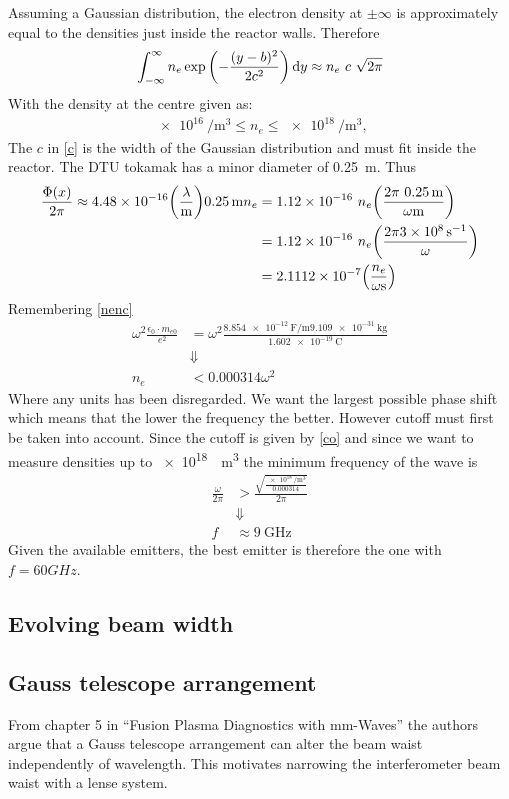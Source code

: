 Assuming a Gaussian distribution, the electron density at \(\pm\infty\) is approximately equal to the densities just inside the reactor walls. Therefore
\begin{align}
  \int_{-\infty}^{\infty}n_e \exp\pqty{-\frac{(y-b)^2}{2c^2}}\dd{y} \approx n_e\ c\ \sqrt{2\pi}\label{c}
\end{align}
With the density at the centre given as:
\begin{align}
  \SI{e16}{\per\meter\cubed} \leq n_e \leq \SI{e18}{\per\meter\cubed},
\end{align}
The \(c\) in \cref{c} is the width of the Gaussian distribution and must fit inside the reactor. The DTU tokamak has a minor diameter of \SI{0.25}{\meter}. Thus
\begin{align}
  \frac{\Phi(x)}{2\pi} \approx 4.48\times 10^{-16}\pqty{\frac{\lambda}{\si{\meter}}}\SI{0.25}{\meter}n_e &= 1.12\times 10^{-16}\ n_e \pqty{\frac{2\pi\ \SI{0.25}{\meter}}{\omega\si{\meter}}}\\
  &= 1.12\times 10^{-16}\ n_e\pqty{\frac{2\pi\SI{3e8}{\per\second}}{\omega}} \\
  &= 2.1112\times 10^{-7}\pqty{\frac{n_e}{\omega\si{\second}}}
\end{align}
Remembering \cref{nenc}
\begin{align}
  \omega^2\frac{\epsilon_0\cdot m_{e0}}{e^2} &= \omega^2\frac{\SI{8.854e-12}{\farad\per\meter}\SI{9.109e-31}{\kilo\gram}}{\SI{1.602e-19}{\coulomb}}\\
  &\Downarrow\nonumber\\
  n_e &< 0.000314\omega^2 \label{co}
\end{align}
Where any units has been disregarded. We want the largest possible phase shift which means that the lower the frequency the better. However cutoff must first be taken into account.
Since the cutoff is given by \cref{co} and since we want to measure densities up to \SI{e18}{\per\meter\cubed} the minimum frequency of the wave is
\begin{align}
  \frac{\omega}{2\pi} &> \frac{\sqrt{\frac{\SI{e18}{\per\meter\cubed}}{0.000314}}}{2\pi}\\
  &\Downarrow\nonumber\\
  f &\approx \SI{9}{\giga\hertz}
\end{align}
Given the available emitters, the best emitter is therefore the one with $f=60\si{GHz}$.

\subsection{Evolving beam width}

\subsection{Gauss telescope arrangement}
From chapter 5 in ``Fusion Plasma Diagnostics with mm-Waves''\cite{PlasmaDiagnosis} the authors argue that a Gauss telescope arrangement can alter the beam waist independently of wavelength. This motivates narrowing the interferometer beam waist with a lense system.

